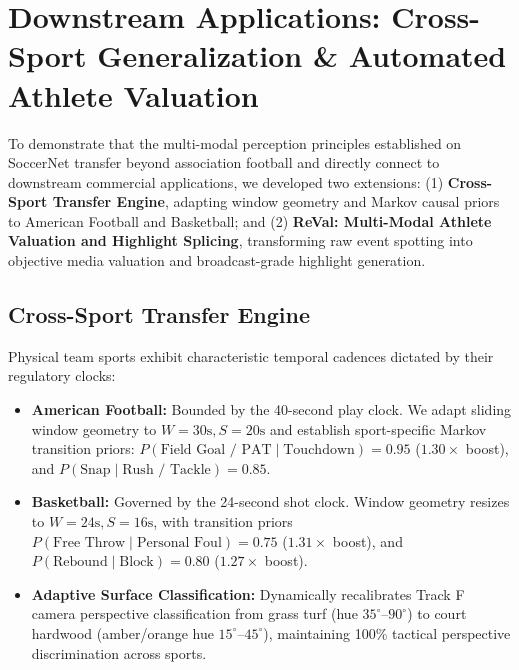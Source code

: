 \documentclass[10pt,twocolumn,letterpaper]{article}
\begin{document}
\section{Downstream Applications: Cross-Sport Generalization \& Automated Athlete Valuation}
\label{sec:downstream_applications}

To demonstrate that the multi-modal perception principles established on SoccerNet transfer beyond association football and directly connect to downstream commercial applications, we developed two extensions: (1) \textbf{Cross-Sport Transfer Engine}, adapting window geometry and Markov causal priors to American Football and Basketball; and (2) \textbf{ReVal: Multi-Modal Athlete Valuation and Highlight Splicing}, transforming raw event spotting into objective media valuation and broadcast-grade highlight generation.

\subsection{Cross-Sport Transfer Engine}
Physical team sports exhibit characteristic temporal cadences dictated by their regulatory clocks:
\begin{itemize}
    \item \textbf{American Football:} Bounded by the 40-second play clock. We adapt sliding window geometry to $W=30\text{s}, S=20\text{s}$ and establish sport-specific Markov transition priors: $P(\text{Field Goal / PAT} \mid \text{Touchdown}) = 0.95$ ($1.30\times$ boost), and $P(\text{Snap} \mid \text{Rush / Tackle}) = 0.85$.
    \item \textbf{Basketball:} Governed by the 24-second shot clock. Window geometry resizes to $W=24\text{s}, S=16\text{s}$, with transition priors $P(\text{Free Throw} \mid \text{Personal Foul}) = 0.75$ ($1.31\times$ boost), and $P(\text{Rebound} \mid \text{Block}) = 0.80$ ($1.27\times$ boost).
    \item \textbf{Adaptive Surface Classification:} Dynamically recalibrates Track F camera perspective classification from grass turf (hue $35^\circ\text{--}90^\circ$) to court hardwood (amber/orange hue $15^\circ\text{--}45^\circ$), maintaining 100\% tactical perspective discrimination across sports.
\end{itemize}
\end{document}
